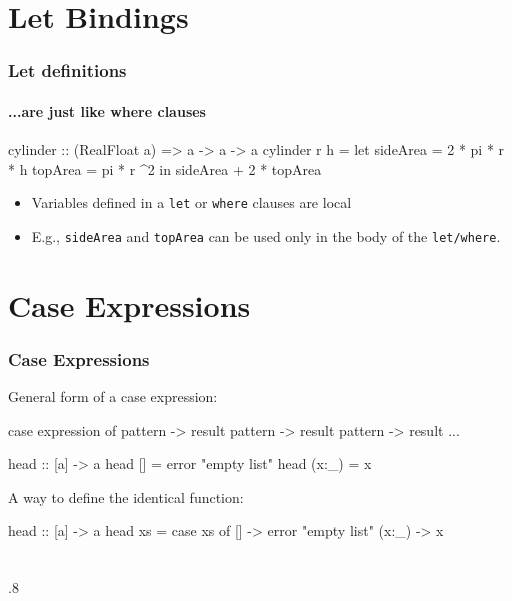 \documentclass{beamer}
\newenvironment{codeblock}[1][.8]{%
\begin{columns}
\begin{column}{#1\linewidth}
\begin{exampleblock}{}}{%
\end{exampleblock}
\end{column}
\end{columns}}
\begin{document}
\section{Let Bindings}


\begin{frame}[fragile]
\frametitle{Let definitions}
\framesubtitle{...are just like where clauses}

\begin{hcode}
cylinder :: (RealFloat a) => a -> a -> a  
cylinder r h = 
    let 
        sideArea = 2 * pi * r * h  
        topArea  = pi * r ^2  
    in  
        sideArea + 2 * topArea 
\end{hcode}

\begin{itemize}
\item Variables defined in a \verb+let+ or \verb+where+ clauses are local
\item E.g., \verb+sideArea+ and \verb+topArea+ can be used only in the body of the \verb+let/where+.
\end{itemize}

\end{frame}


\section{Case Expressions}


\begin{frame}[fragile]
\frametitle{Case Expressions}

General form of a case expression:
\begin{hcode}
case expression of pattern -> result  
                   pattern -> result  
                   pattern -> result  
                   ...  
\end{hcode}
\pause\vfill
\begin{hcode}
head :: [a] -> a  
head []    = error "empty list"  
head (x:_) = x 
\end{hcode}

\pause\vfill
A way to define the identical function:
\begin{hcode}
head :: [a] -> a  
head xs = case xs of 
               []    -> error "empty list"  
               (x:_) -> x  
\end{hcode}


\end{frame}

\begin{frame}[fragile]
\frametitle{}

\begin{codeblock}
\begin{hcode}

\end{hcode}
\end{codeblock}

\end{frame}
\end{document}
